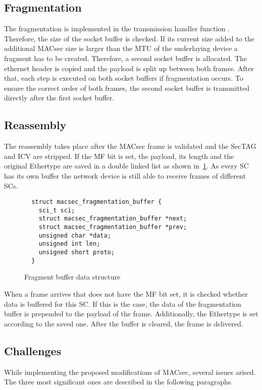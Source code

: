\subsection{Fragmentation}
The fragmentation is implemented in the transmission handler function .
Therefore, the size of the socket buffer is checked.
If its current size added to the additional \gls{MACsec} size is larger than the \gls{MTU} of the underlaying device a fragment has to be created.
Therefore, a second socket buffer is allocated.
The ethernet header is copied and the payload is split up between both frames.
After that, each step is executed on both socket buffers if fragmentation occurs.
To ensure the correct order of both frames, the second socket buffer is transmitted directly after the first socket buffer.

\subsection{Reassembly}
The reassembly takes place after the \gls{MACsec} frame is validated and the \gls{SecTAG} and \gls{ICV} are stripped.
If the \acrfull{MF} bit is set, the payload, its length and the original Ethertype are saved in a double linked list as shown in~\ref{lst:frag_buff}.
As every \acrfull{SC} has its own buffer the network device is still able to receive frames of different \glspl{SC}.

\begin{figure}
  \lstset{language=C}
  \begin{lstlisting}
  struct macsec_fragmentation_buffer {
    sci_t sci;
    struct macsec_fragmentation_buffer *next;
    struct macsec_fragmentation_buffer *prev;
    unsigned char *data;
    unsigned int len;
    unsigned short proto;
  }
  \end{lstlisting}
  \caption{Fragment buffer data structure}
  \label{lst:frag_buff}
\end{figure}

When a frame arrives that does not have the \gls{MF} bit set, it is checked whether data is buffered for this \gls{SC}.
If this is the case, the data of the fragmentation buffer is prepended to the payload of the frame.
Additionally, the Ethertype is set according to the saved one.
After the buffer is cleared, the frame is delivered.

\subsection{Challenges}
While implementing the proposed modifications of \gls{MACsec}, several issues arised.
The three most significant ones are described in the following paragraphs.

